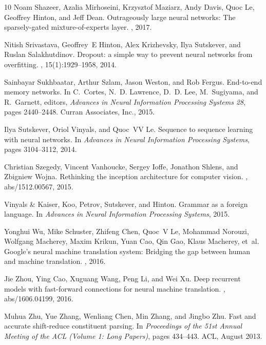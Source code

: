 \documentclass{article}
\begin{document}
\begin{thebibliography}{10}
Noam Shazeer, Azalia Mirhoseini, Krzysztof Maziarz, Andy Davis, Quoc Le,
  Geoffrey Hinton, and Jeff Dean.
\newblock Outrageously large neural networks: The sparsely-gated
  mixture-of-experts layer.
, 2017.

Nitish Srivastava, Geoffrey~E Hinton, Alex Krizhevsky, Ilya Sutskever, and
  Ruslan Salakhutdinov.
\newblock Dropout: a simple way to prevent neural networks from overfitting.
, 15(1):1929--1958, 2014.

Sainbayar Sukhbaatar, Arthur Szlam, Jason Weston, and Rob Fergus.
\newblock End-to-end memory networks.
\newblock In C.~Cortes, N.~D. Lawrence, D.~D. Lee, M.~Sugiyama, and R.~Garnett,
  editors, {\em Advances in Neural Information Processing Systems 28}, pages
  2440--2448. Curran Associates, Inc., 2015.

Ilya Sutskever, Oriol Vinyals, and Quoc~VV Le.
\newblock Sequence to sequence learning with neural networks.
\newblock In {\em Advances in Neural Information Processing Systems}, pages
  3104--3112, 2014.

Christian Szegedy, Vincent Vanhoucke, Sergey Ioffe, Jonathon Shlens, and
  Zbigniew Wojna.
\newblock Rethinking the inception architecture for computer vision.
, abs/1512.00567, 2015.

{Vinyals {\&} Kaiser}, Koo, Petrov, Sutskever, and Hinton.
\newblock Grammar as a foreign language.
\newblock In {\em Advances in Neural Information Processing Systems}, 2015.

Yonghui Wu, Mike Schuster, Zhifeng Chen, Quoc~V Le, Mohammad Norouzi, Wolfgang
  Macherey, Maxim Krikun, Yuan Cao, Qin Gao, Klaus Macherey, et~al.
\newblock Google's neural machine translation system: Bridging the gap between
  human and machine translation.
, 2016.

Jie Zhou, Ying Cao, Xuguang Wang, Peng Li, and Wei Xu.
\newblock Deep recurrent models with fast-forward connections for neural
  machine translation.
, abs/1606.04199, 2016.

Muhua Zhu, Yue Zhang, Wenliang Chen, Min Zhang, and Jingbo Zhu.
\newblock Fast and accurate shift-reduce constituent parsing.
\newblock In {\em Proceedings of the 51st Annual Meeting of the ACL (Volume 1:
  Long Papers)}, pages 434--443. ACL, August 2013.

\end{thebibliography}
\end{document}
